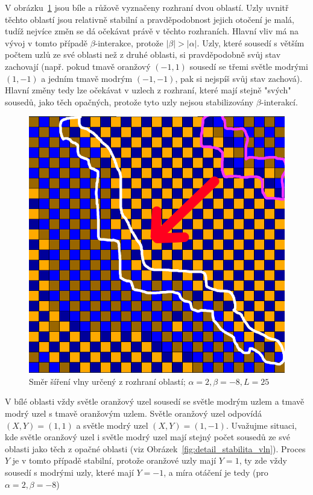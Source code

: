 \documentclass{article}
\begin{document}
V obrázku~\ref{fig:vlna_smer} jsou bíle a růžově vyznačeny rozhraní dvou oblastí. Uzly uvnitř těchto oblastí jsou relativně stabilní a pravděpodobnost jejich otočení je malá, tudíž nejvíce změn se dá očekávat právě v těchto rozhraních. Hlavní vliv má na vývoj v tomto případě $\beta$-interakce, protože $|\beta| > |\alpha|$. Uzly, které sousedí s větším počtem uzlů ze své oblasti než z druhé oblasti, si pravděpodobně svůj stav zachovají (např. pokud tmavě oranžový $(-1, 1)$ sousedí se třemi světle modrými $(1, -1)$ a jedním tmavě modrým $(-1, -1)$, pak si nejspíš svůj stav zachová). Hlavní změny tedy lze očekávat v uzlech z rozhraní, které mají stejně "svých" sousedů, jako těch opačných, protože tyto uzly nejsou stabilizovány $\beta$-interakcí.

\begin{figure}[H]
 \includegraphics[scale=0.5]{vlna_smer}
 \caption{Směr šíření vlny určený z rozhraní oblastí; $\alpha = 2, \beta = -8, L = 25$}
 \label{fig:vlna_smer}
\end{figure}

V bílé oblasti vždy světle oranžový uzel sousedí se světle modrým uzlem a tmavě modrý uzel s tmavě oranžovým uzlem. Světle oranžový uzel odpovídá $(X, Y) = (1, 1)$ a světle modrý uzel $(X, Y) = (1, -1)$. Uvažujme situaci, kde světle oranžový uzel i světle modrý uzel mají stejný počet sousedů ze své oblasti jako těch z opačné oblasti (viz Obrázek~\ref{fig:detail_stabilita_vln}). Proces $Y$ je v tomto případě stabilní, protože oranžové uzly mají $Y = 1$, ty zde vždy sousedí s modrými uzly, které mají $Y = -1$, a míra otáčení je tedy (pro $\alpha = 2, \beta = -8$)
\end{document}
